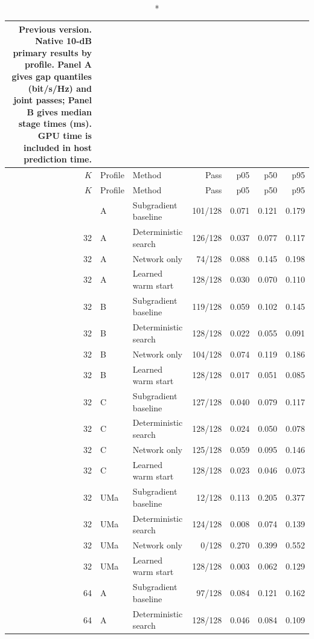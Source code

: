 \documentclass[10pt,letterpaper]{article}
\begin{document}
\begingroup\edef\DIFsavedtable{\number\value{table}}\color{red}\begingroup\small\setlength{\tabcolsep}{4pt}
\begin{longtable}{rllrrrr}\caption*{Previous version. Native 10-dB primary results by profile. Panel A gives gap quantiles (bit/s/Hz) and joint passes; Panel B gives median stage times (ms). GPU time is included in host prediction time.}\\
\toprule $K$ & Profile & Method & Pass & p05 & p50 & p95\\\midrule\endfirsthead\toprule $K$ & Profile & Method & Pass & p05 & p50 & p95\\\midrule\endhead\bottomrule\endfoot
32 & A & Subgradient baseline & 101/128 & 0.071 & 0.121 & 0.179\\
32 & A & Deterministic search & 126/128 & 0.037 & 0.077 & 0.117\\
32 & A & Network only & 74/128 & 0.088 & 0.145 & 0.198\\
32 & A & Learned warm start & 128/128 & 0.030 & 0.070 & 0.110\\
32 & B & Subgradient baseline & 119/128 & 0.059 & 0.102 & 0.145\\
32 & B & Deterministic search & 128/128 & 0.022 & 0.055 & 0.091\\
32 & B & Network only & 104/128 & 0.074 & 0.119 & 0.186\\
32 & B & Learned warm start & 128/128 & 0.017 & 0.051 & 0.085\\
32 & C & Subgradient baseline & 127/128 & 0.040 & 0.079 & 0.117\\
32 & C & Deterministic search & 128/128 & 0.024 & 0.050 & 0.078\\
32 & C & Network only & 125/128 & 0.059 & 0.095 & 0.146\\
32 & C & Learned warm start & 128/128 & 0.023 & 0.046 & 0.073\\
32 & UMa & Subgradient baseline & 12/128 & 0.113 & 0.205 & 0.377\\
32 & UMa & Deterministic search & 124/128 & 0.008 & 0.074 & 0.139\\
32 & UMa & Network only & 0/128 & 0.270 & 0.399 & 0.552\\
32 & UMa & Learned warm start & 128/128 & 0.003 & 0.062 & 0.129\\
64 & A & Subgradient baseline & 97/128 & 0.084 & 0.121 & 0.162\\
64 & A & Deterministic search & 128/128 & 0.046 & 0.084 & 0.109\\

\end{longtable}
\end{document}
